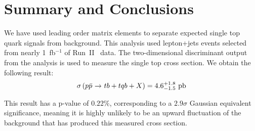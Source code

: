 \section{Summary and Conclusions}
\label{summary}

We have used leading order matrix elements to separate expected single
top quark signals from background. This analysis used lepton+jets
events selected from nearly 1~fb$^{-1}$ of Run~II~ data. The
two-dimensional discriminant output from the analysis is used to
measure the single top cross section. We obtain the following result:
$$
\sigma\left({\mbox{$p\bar{p}$}}{\mbox{ $\rightarrow$ }}tb+tqb+X\right)
= 4.6^{+1.8}_{-1.5}~{\rm pb}
$$

This result has a p-value of $0.22\%$, corresponding to a $2.9\sigma$
Gaussian equivalent significance, meaning it is highly unlikely to be
an upward fluctuation of the background that has produced this
measured cross section.
